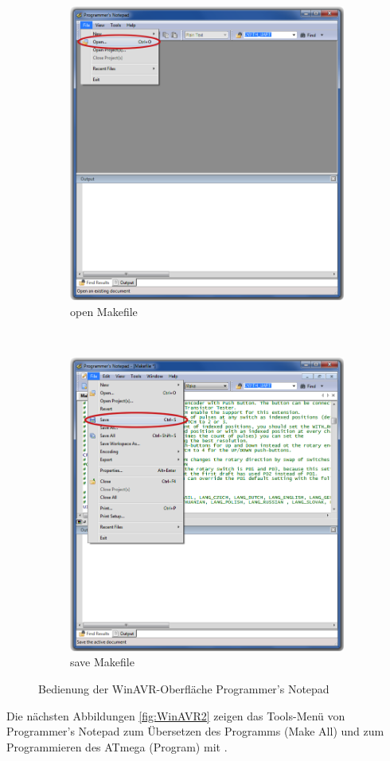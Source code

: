 \begin{figure}[H]
  \begin{subfigure}[b]{.5\textwidth}
    \centering
    \includegraphics[width=.85\textwidth]{../PNG/Notepad_open.png}
    \caption{open Makefile}
  \end{subfigure}
  ~
  \begin{subfigure}[b]{.5\textwidth}
    \centering
    \includegraphics[width=.85\textwidth]{../PNG/Notepad_save.png}
    \caption{save Makefile}
  \end{subfigure}
  \caption{Bedienung der WinAVR-Oberfläche Programmer's Notepad}
  \label{fig:WinAVR1}
\end{figure}
Die nächsten Abbildungen \ref{fig:WinAVR2} zeigen das Tools-Menü von Programmer's Notepad
zum Übersetzen des Programms (Make All) und zum Programmieren des ATmega (Program) mit .

